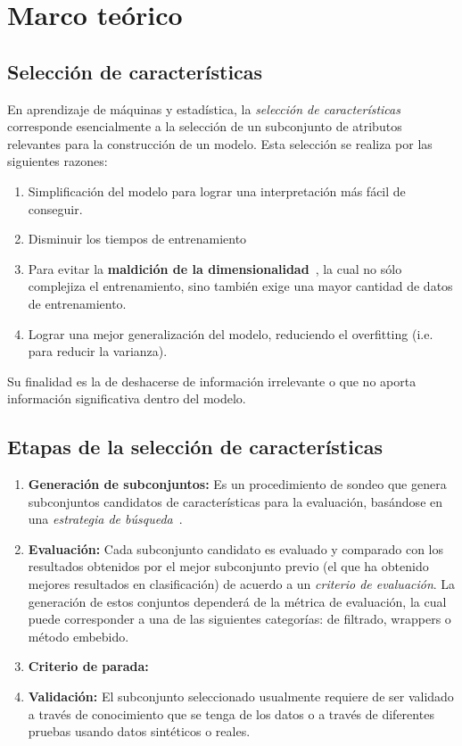 \section{Marco te\'orico}\label{sec2}
\subsection{Selecci\'on de caracter\'isticas}
En aprendizaje de m\'aquinas y estad\'istica, la \textit{selecci\'on de caracter\'isticas} corresponde esencialmente a la selecci\'on de un subconjunto de atributos relevantes para la construcci\'on de un modelo. Esta selecci\'on se realiza por las siguientes razones:
\begin{enumerate}
\item Simplificaci\'on del modelo para lograr una interpretaci\'on m\'as f\'acil de conseguir.
\item Disminuir los tiempos de entrenamiento
\item Para evitar la \textbf{maldici\'on de la dimensionalidad}~\cite{bellman}, la cual no s\'olo complejiza el entrenamiento, sino tambi\'en exige una mayor cantidad de datos de entrenamiento.
\item Lograr una mejor generalizaci\'on del modelo, reduciendo el overfitting (i.e. para reducir la varianza).
\end{enumerate}

Su finalidad es la de deshacerse de informaci\'on irrelevante o que no aporta informaci\'on significativa dentro del modelo. 
\subsection{Etapas de la selecci\'on de caracter\'isticas}
\begin{enumerate}
\item \textbf{Generaci\'on de subconjuntos:} Es un procedimiento de sondeo que genera subconjuntos candidatos de caracter\'isticas para la evaluaci\'on, bas\'andose en una \textit{estrategia de b\'usqueda}~\cite{liuyu}. 
\item \textbf{Evaluaci\'on:} Cada subconjunto candidato es evaluado y comparado con los resultados obtenidos por el mejor subconjunto previo (el que ha obtenido mejores resultados en clasificaci\'on) de acuerdo a un \textit{criterio de evaluaci\'on}. La generaci\'on de estos conjuntos depender\'a de la m\'etrica de evaluaci\'on, la cual puede corresponder a una de las siguientes categor\'ias: de filtrado, wrappers o m\'etodo embebido.
\item \textbf{Criterio de parada:}
\item \textbf{Validaci\'on:} El subconjunto seleccionado usualmente requiere de ser validado a trav\'es de conocimiento que se tenga de los datos o a trav\'es de diferentes pruebas usando datos sint\'eticos o reales.
\end{enumerate}
